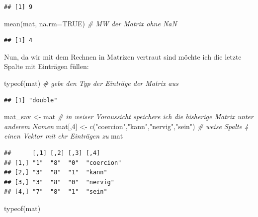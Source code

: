 \documentclass[
]{book}
\newenvironment{Shaded}{\begin{snugshade}}{\end{snugshade}}
\newcommand{\AttributeTok}[1]{\textcolor[rgb]{0.77,0.63,0.00}{#1}}
\newcommand{\CommentTok}[1]{\textcolor[rgb]{0.56,0.35,0.01}{\textit{#1}}}
\newcommand{\ConstantTok}[1]{\textcolor[rgb]{0.00,0.00,0.00}{#1}}
\newcommand{\DecValTok}[1]{\textcolor[rgb]{0.00,0.00,0.81}{#1}}
\newcommand{\FunctionTok}[1]{\textcolor[rgb]{0.00,0.00,0.00}{#1}}
\newcommand{\NormalTok}[1]{#1}
\newcommand{\OtherTok}[1]{\textcolor[rgb]{0.56,0.35,0.01}{#1}}
\newcommand{\StringTok}[1]{\textcolor[rgb]{0.31,0.60,0.02}{#1}}
\theoremstyle{definition}
\theoremstyle{definition}
\theoremstyle{definition}
\theoremstyle{definition}
\theoremstyle{remark}
\begin{document}
\begin{verbatim}
## [1] 9
\end{verbatim}

\begin{Shaded}
\begin{Highlighting}[]
\FunctionTok{mean}\NormalTok{(mat, }\AttributeTok{na.rm=}\ConstantTok{TRUE}\NormalTok{)     }\CommentTok{\# MW der Matrix ohne NaN}
\end{Highlighting}
\end{Shaded}

\begin{verbatim}
## [1] 4
\end{verbatim}

Nun, da wir mit dem Rechnen in Matrizen vertraut sind möchte ich die
letzte Spalte mit Einträgen füllen:

\begin{Shaded}
\begin{Highlighting}[]
\FunctionTok{typeof}\NormalTok{(mat)             }\CommentTok{\# gebe den Typ der Einträge der Matrix aus}
\end{Highlighting}
\end{Shaded}

\begin{verbatim}
## [1] "double"
\end{verbatim}

\begin{Shaded}
\begin{Highlighting}[]
\NormalTok{mat\_sav }\OtherTok{\textless{}{-}}\NormalTok{ mat          }\CommentTok{\# in weiser Voraussicht speichere ich die bisherige Matrix unter anderem Namen}
\NormalTok{mat[,}\DecValTok{4}\NormalTok{] }\OtherTok{\textless{}{-}} \FunctionTok{c}\NormalTok{(}\StringTok{"coercion"}\NormalTok{,}\StringTok{"kann"}\NormalTok{,}\StringTok{"nervig"}\NormalTok{,}\StringTok{"sein"}\NormalTok{)  }\CommentTok{\# weise Spalte 4 einen Vektor mit chr Einträgen zu}
\NormalTok{mat }
\end{Highlighting}
\end{Shaded}

\begin{verbatim}
##      [,1] [,2] [,3] [,4]      
## [1,] "1"  "8"  "0"  "coercion"
## [2,] "3"  "8"  "1"  "kann"    
## [3,] "3"  "8"  "0"  "nervig"  
## [4,] "7"  "8"  "1"  "sein"
\end{verbatim}

\begin{Shaded}
\begin{Highlighting}[]
\FunctionTok{typeof}\NormalTok{(mat)}
\end{Highlighting}
\end{Shaded}
\end{document}
